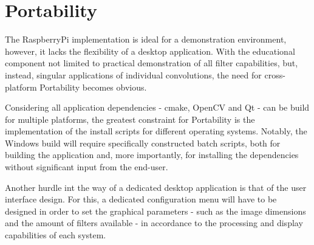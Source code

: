 \section{Portability}

The RaspberryPi implementation is ideal for a demonstration environment, however, it lacks the flexibility
of a desktop application. With the educational component not limited to practical demonstration of all 
filter capabilities, but, instead, singular applications of individual convolutions, the need for 
cross-platform Portability becomes obvious.

Considering all application dependencies - cmake, OpenCV and Qt - can be build for multiple platforms,
the greatest constraint for Portability is the implementation of the install scripts for different operating
systems. Notably, the Windows build will require specifically constructed batch scripts, both for 
building the application and, more importantly, for installing the dependencies without significant input
from the end-user.

Another hurdle int the way of a dedicated desktop application is that of the user interface design. For this, 
a dedicated configuration menu will have to be designed in order to set the graphical parameters - such as
the image dimensions and the amount of filters available - in accordance to the processing and display 
capabilities of each system.
